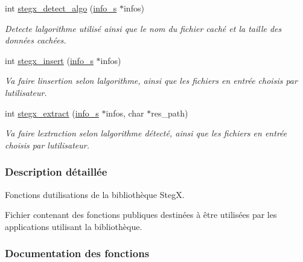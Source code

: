 \begin{DoxyCompactItemize}
int \hyperlink{a00005_a2a3747fdc90ed4467eb3e468d8fba361}{stegx\+\_\+detect\+\_\+algo} (\hyperlink{a00008_aa8ca908d92fb5bdd3c0a9e1f58b2cf03}{info\+\_\+s} $\ast$infos)
\begin{DoxyCompactList}\small\item\em Detecte l\textquotesingle{}algorithme utilisé ainsi que le nom du fichier caché et la taille des données cachées. \end{DoxyCompactList}\item 
int \hyperlink{a00005_a45a1d0709604d55e9d467cb39d6a5b54}{stegx\+\_\+insert} (\hyperlink{a00008_aa8ca908d92fb5bdd3c0a9e1f58b2cf03}{info\+\_\+s} $\ast$infos)
\begin{DoxyCompactList}\small\item\em Va faire l\textquotesingle{}insertion selon l\textquotesingle{}algorithme, ainsi que les fichiers en entrée choisis par l\textquotesingle{}utilisateur. \end{DoxyCompactList}\item 
int \hyperlink{a00005_a43c63dd958bfa1f4ab2ecbd7faa14abb}{stegx\+\_\+extract} (\hyperlink{a00008_aa8ca908d92fb5bdd3c0a9e1f58b2cf03}{info\+\_\+s} $\ast$infos, char $\ast$res\+\_\+path)
\begin{DoxyCompactList}\small\item\em Va faire l\textquotesingle{}extraction selon l\textquotesingle{}algorithme détecté, ainsi que les fichiers en entrée choisis par l\textquotesingle{}utilisateur. \end{DoxyCompactList}\end{DoxyCompactItemize}


\subsubsection{Description détaillée}
Fonctions d\textquotesingle{}utilisations de la bibliothèque StegX. 

Fichier contenant des fonctions publiques destinées à être utilisées par les applications utilisant la bibliothèque. 

\subsubsection{Documentation des fonctions}
\mbox{\label{a00005_aa5b31aaae617d7c5d0c29d564e2c8a42}} 
